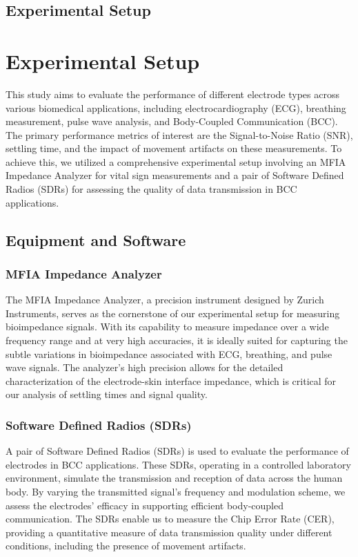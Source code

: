 \documentclass[conference]{IEEEtran}
\begin{document}
\subsection{Experimental Setup}
\section{Experimental Setup}

This study aims to evaluate the performance of different electrode types across various biomedical applications, including electrocardiography (ECG), breathing measurement, pulse wave analysis, and Body-Coupled Communication (BCC). The primary performance metrics of interest are the Signal-to-Noise Ratio (SNR), settling time, and the impact of movement artifacts on these measurements. To achieve this, we utilized a comprehensive experimental setup involving an MFIA Impedance Analyzer for vital sign measurements and a pair of Software Defined Radios (SDRs) for assessing the quality of data transmission in BCC applications.

\subsection{Equipment and Software}

\subsubsection{MFIA Impedance Analyzer}
The MFIA Impedance Analyzer, a precision instrument designed by Zurich Instruments, serves as the cornerstone of our experimental setup for measuring bioimpedance signals. With its capability to measure impedance over a wide frequency range and at very high accuracies, it is ideally suited for capturing the subtle variations in bioimpedance associated with ECG, breathing, and pulse wave signals. The analyzer's high precision allows for the detailed characterization of the electrode-skin interface impedance, which is critical for our analysis of settling times and signal quality.

\subsubsection{Software Defined Radios (SDRs)}
A pair of Software Defined Radios (SDRs) is used to evaluate the performance of electrodes in BCC applications. These SDRs, operating in a controlled laboratory environment, simulate the transmission and reception of data across the human body. By varying the transmitted signal's frequency and modulation scheme, we assess the electrodes' efficacy in supporting efficient body-coupled communication. The SDRs enable us to measure the Chip Error Rate (CER), providing a quantitative measure of data transmission quality under different conditions, including the presence of movement artifacts.
\end{document}
